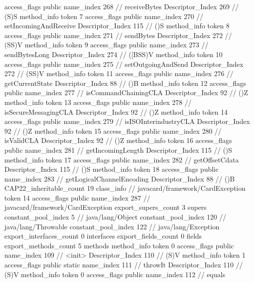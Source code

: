 {{{{{					access_flags	public
					name_index	268		// receiveBytes
					Descriptor_Index	269		// (S)S
				}
				method_info {
					token	7
					access_flags	public
					name_index	270		// setIncomingAndReceive
					Descriptor_Index	115		// ()S
				}
				method_info {
					token	8
					access_flags	public
					name_index	271		// sendBytes
					Descriptor_Index	272		// (SS)V
				}
				method_info {
					token	9
					access_flags	public
					name_index	273		// sendBytesLong
					Descriptor_Index	274		// ([BSS)V
				}
				method_info {
					token	10
					access_flags	public
					name_index	275		// setOutgoingAndSend
					Descriptor_Index	272		// (SS)V
				}
				method_info {
					token	11
					access_flags	public
					name_index	276		// getCurrentState
					Descriptor_Index	88		// ()B
				}
				method_info {
					token	12
					access_flags	public
					name_index	277		// isCommandChainingCLA
					Descriptor_Index	92		// ()Z
				}
				method_info {
					token	13
					access_flags	public
					name_index	278		// isSecureMessagingCLA
					Descriptor_Index	92		// ()Z
				}
				method_info {
					token	14
					access_flags	public
					name_index	279		// isISOInterindustryCLA
					Descriptor_Index	92		// ()Z
				}
				method_info {
					token	15
					access_flags	public
					name_index	280		// isValidCLA
					Descriptor_Index	92		// ()Z
				}
				method_info {
					token	16
					access_flags	public
					name_index	281		// getIncomingLength
					Descriptor_Index	115		// ()S
				}
				method_info {
					token	17
					access_flags	public
					name_index	282		// getOffsetCdata
					Descriptor_Index	115		// ()S
				}
				method_info {
					token	18
					access_flags	public
					name_index	283		// getLogicalChannelEncoding
					Descriptor_Index	88		// ()B
				}
			}
			CAP22_inheritable_count	19
		}
		class_info {		// javacard/framework/CardException
			token	14
			access_flags	public
			name_index	287		// javacard/framework/CardException
			export_supers_count	3
			supers {
				constant_pool_index	5		// java/lang/Object
				constant_pool_index	120		// java/lang/Throwable
				constant_pool_index	122		// java/lang/Exception
			}
			export_interfaces_count	0
			interfaces {
			}
			export_fields_count	0
			fields {
			}
			export_methods_count	5
			methods {
				method_info {
					token	0
					access_flags	public
					name_index	109		// <init>
					Descriptor_Index	110		// (S)V
				}
				method_info {
					token	1
					access_flags	public static
					name_index	111		// throwIt
					Descriptor_Index	110		// (S)V
				}
				method_info {
					token	0
					access_flags	public
					name_index	112		// equals
}}}}}
